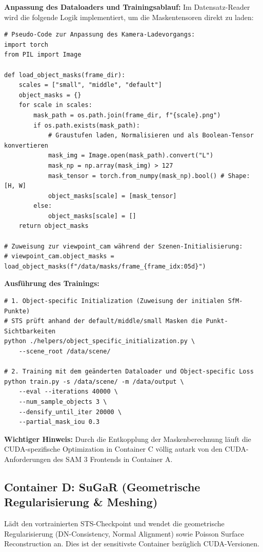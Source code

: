\documentclass[12pt,a4paper]{article}
\begin{document}
\textbf{Anpassung des Dataloaders und Trainingsablauf:}
Im Datensatz-Reader wird die folgende Logik implementiert, um die Maskentensoren direkt zu laden:
\begin{verbatim}
# Pseudo-Code zur Anpassung des Kamera-Ladevorgangs:
import torch
from PIL import Image

def load_object_masks(frame_dir):
    scales = ["small", "middle", "default"]
    object_masks = {}
    for scale in scales:
        mask_path = os.path.join(frame_dir, f"{scale}.png")
        if os.path.exists(mask_path):
            # Graustufen laden, Normalisieren und als Boolean-Tensor konvertieren
            mask_img = Image.open(mask_path).convert("L")
            mask_np = np.array(mask_img) > 127
            mask_tensor = torch.from_numpy(mask_np).bool() # Shape: [H, W]
            object_masks[scale] = [mask_tensor]
        else:
            object_masks[scale] = []
    return object_masks

# Zuweisung zur viewpoint_cam während der Szenen-Initialisierung:
# viewpoint_cam.object_masks = load_object_masks(f"/data/masks/frame_{frame_idx:05d}")
\end{verbatim}

\textbf{Ausführung des Trainings:}
\begin{verbatim}
# 1. Object-specific Initialization (Zuweisung der initialen SfM-Punkte)
# STS prüft anhand der default/middle/small Masken die Punkt-Sichtbarkeiten
python ./helpers/object_specific_initialization.py \
    --scene_root /data/scene/

# 2. Training mit dem geänderten Dataloader und Object-specific Loss
python train.py -s /data/scene/ -m /data/output \
    --eval --iterations 40000 \
    --num_sample_objects 3 \
    --densify_until_iter 20000 \
    --partial_mask_iou 0.3
\end{verbatim}

\textbf{Wichtiger Hinweis:} Durch die Entkopplung der Maskenberechnung läuft die CUDA-spezifische Optimization in Container C völlig autark von den CUDA-Anforderungen des SAM 3 Frontends in Container A.

\subsection*{Container D: SuGaR (Geometrische Regularisierung \& Meshing)}
Lädt den vortrainierten STS-Checkpoint und wendet die geometrische Regularisierung (DN-Consistency, Normal Alignment) sowie Poisson Surface Reconstruction an. Dies ist der sensitivste Container bezüglich CUDA-Versionen.
\end{document}
